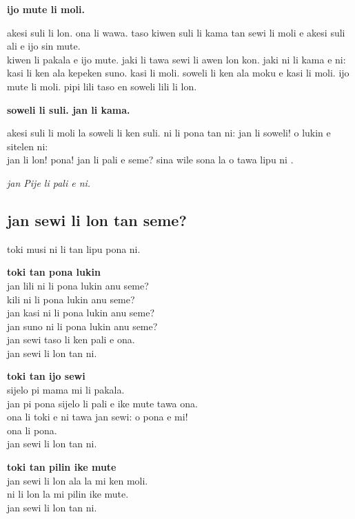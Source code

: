 \textbf{ijo mute li moli.} 

akesi suli li lon. ona li wawa. taso kiwen suli li kama tan sewi li moli e akesi suli ali e ijo sin mute.  \\
kiwen li pakala e ijo mute. jaki li tawa sewi li awen lon kon. jaki ni li kama e ni: kasi li ken ala kepeken suno. kasi li moli. soweli li ken ala moku e kasi li moli. ijo mute li moli. pipi lili taso en soweli lili li lon.

\textbf{soweli li suli. jan li kama.} 

akesi suli li moli la soweli li ken suli. ni li pona tan ni: jan li soweli! o lukin e sitelen ni:  \\
jan li lon! pona! jan li pali e seme? sina wile sona la o tawa lipu ni \cite{www:Pije:01}.

\textit{jan Pije li pali e ni. \cite{www:Pije:01}}
%
\newpage
\subsection{jan sewi li lon tan seme?}

toki musi ni li tan lipu pona ni.

\textbf{toki tan pona lukin}   \\
jan lili ni li pona lukin anu seme?   \\
kili ni li pona lukin anu seme?   \\
jan kasi ni li pona lukin anu seme?   \\
jan suno ni li pona lukin anu seme?   \\
jan sewi taso li ken pali e ona.   \\
jan sewi li lon tan ni.

\textbf{toki tan ijo sewi}   \\
sijelo pi mama mi li pakala.   \\
jan pi pona sijelo li pali e ike mute tawa ona.   \\
ona li toki e ni tawa jan sewi: o pona e mi!   \\
ona li pona.   \\
jan sewi li lon tan ni.

\textbf{toki tan pilin ike mute}   \\
jan sewi li lon ala la mi ken moli.   \\
ni li lon la mi pilin ike mute.   \\
jan sewi li lon tan ni.

